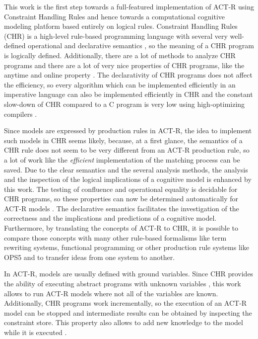 This work is the first step towards a full-featured implementation of ACT-R using Constraint Handling Rules and hence towards a computational cognitive modeling platform based entirely on logical rules. Constraint Handling Rules (CHR) is a high-level rule-based programming language with several very well-defined operational and declarative semantics \cite[49\psqq]{fru_chr_book_2009}, so the meaning of a CHR program is logically defined. Additionally, there are a lot of methods to analyze CHR programs \cite[96\psqq]{fru_chr_book_2009} and there are a lot of very nice properties of CHR programs, like the anytime and online property \cite[83\psqq]{fru_chr_book_2009}. The declarativity of CHR programs does not affect the efficiency, so every algorithm which can be implemented efficiently in an imperative language can also be implemented efficiently in CHR and the constant slow-down of CHR compared to a C program is very low using high-optimizing compilers \cite[94]{fru_chr_book_2009}.

Since models are expressed by production rules in ACT-R, the idea to implement such models in CHR seems likely, because, at a first glance, the semantics of a CHR rule does not seem to be very different from an ACT-R production rule, so a lot of work like the \emph{efficient} implementation of the matching process can be saved. Due to the clear semantics and the several analysis methods, the analysis and the inspection of the logical implications of a cognitive model is enhanced by this work. The testing of confluence and operational equality is decidable for CHR programs, so these properties can now be determined automatically for ACT-R models \cite[4]{chr_lecture_chap6}. The declarative semantics facilitates the investigation of the correctness and the implications and predictions of a cognitive model. Furthermore, by translating the concepts of ACT-R to CHR, it is possible to compare those concepts with many other rule-based formalisms like term rewriting systems, functional programming or other production rule systems like OPS5 and to transfer ideas from one system to another\cite[141\psqq]{fru_chr_book_2009}. 

In ACT-R, models are usually defined with ground variables. Since CHR provides the ability of executing abstract programs with unknown variables \cite[4]{chr_lecture_chap6}, this work allows to run ACT-R models where not all of the variables are known. Additionally, CHR programs work incrementally, so the execution of an ACT-R model can be stopped and intermediate results can be obtained by inspecting the constraint store. This property also allows to add new knowledge to the model while it is executed \cite[176]{fru_chr_book_2009}.

